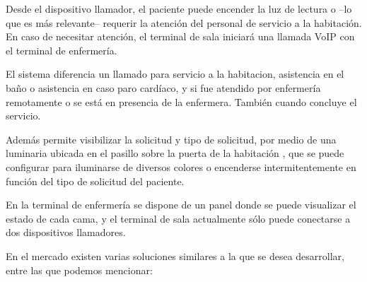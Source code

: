 Desde el dispositivo llamador, el paciente puede encender la luz de lectura o –lo que es más relevante– requerir la atención del personal de servicio a la habitación. En caso de necesitar atención, el terminal de sala iniciará una llamada VoIP con el terminal de enfermería.

El sistema diferencia un llamado para servicio a la habitacion, asistencia en el baño o asistencia en caso paro cardíaco, y si fue atendido por enfermería remotamente o se está en presencia de la enfermera. También cuando concluye el servicio.

Además permite visibilizar la solicitud y tipo de solicitud, por medio de una luminaria ubicada en el pasillo sobre la puerta de la habitación , que se puede configurar para iluminarse de diversos colores o encenderse intermitentemente en función del tipo de solicitud del paciente.

En la terminal de enfermería se dispone de un panel donde se puede visualizar el estado de cada cama, y el terminal de sala actualmente sólo puede conectarse a dos dispositivos llamadores.

En el mercado existen varias soluciones similares a la que se desea desarrollar, entre las que podemos mencionar:

